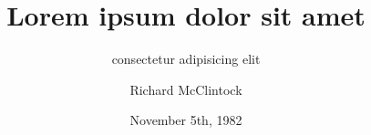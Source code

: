 

\title{Lorem ipsum dolor sit amet}
\subtitle{consectetur adipisicing elit}


\author{Richard McClintock}
\date[05/11/1982]{November 5th, 1982}

